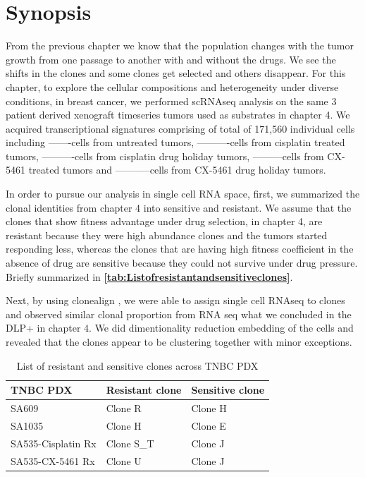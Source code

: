  \section{Synopsis}
 From the previous chapter we know that the population changes with the tumor growth from one passage to another with and without the drugs. We see the shifts in the clones and some clones get selected and others disappear.
For this chapter, to explore the cellular compositions and heterogeneity under diverse conditions, in breast cancer, we performed scRNAseq analysis on the same 3 patient derived xenograft timeseries tumors used as substrates in chapter 4. We acquired transcriptional signatures comprising of total of 171,560 individual cells including -------cells from untreated tumors, ----------cells from cisplatin treated tumors, ----------cells from cisplatin drug holiday tumors, ---------cells from CX-5461 treated tumors and -----------cells from CX-5461 drug holiday tumors.
 
In order to pursue our analysis in single cell RNA space, first, we summarized the clonal identities from chapter 4 into sensitive and resistant. We assume that the clones that show fitness advantage under drug selection, in chapter 4, are resistant because they were high abundance clones and the tumors started responding less, whereas the clones that are having high fitness coefficient in the absence of drug are sensitive because they could not survive under drug pressure. Briefly summarized in  \textbf{\autoref{tab:Listofresistantandsensitiveclones}}.
 
Next, by using clonealign \cite{campbell2019clonealign}, we were able to assign single cell RNAseq to clones and observed similar clonal proportion from RNA seq what we concluded in the DLP+ in chapter 4. 
We did dimentionality reduction embedding of the cells and revealed that the clones appear to be clustering together with minor exceptions. 

   
 \begin{table}[htbp]
   
   \centering
   \caption{List of resistant and sensitive clones across TNBC PDX}
     \begin{tabular}{|l|l|l|}
      \hline
     TNBC PDX & Resistant clone & Sensitive clone \\
     \hline
     SA609  & Clone R & Clone H \\
     SA1035 & Clone H & Clone E \\
     SA535-Cisplatin Rx & Clone S\_T & Clone J \\
     SA535-CX-5461 Rx & Clone U & Clone J \\    \hline
     \end{tabular}%
   \label{tab:Listofresistantandsensitiveclones}%
   
  
 \end{table}%

